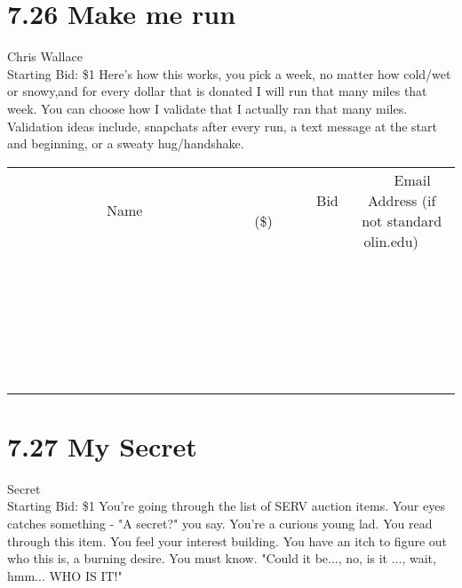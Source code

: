 \documentclass[11pt]{article}
\begin{document}
\section*{7.26 Make me run}
Chris Wallace
\\
Starting Bid: \$1
\newline
Here's how this works, you pick a week, no matter how cold/wet or snowy,and for every dollar that is donated I will run that many miles that week. You can choose how I validate that I actually ran that many miles. Validation ideas include, snapchats after every run, a text message at the start and beginning, or a sweaty hug/handshake.
\\[6ex]
\begin{tabular}{c c c}
~~~~~~~~~~~~~Name~~~~~~~~~~~~~ & ~~~~~~~~~Bid (\$)~~~~~~~~~  & ~~~Email Address (if not standard olin.edu)~~~\\
 & & \\
\hline
 & & \\
\hline
 & & \\
\hline
 & & \\
\hline
 & & \\
\hline
 & & \\
\hline
 & & \\
\hline
 & & \\
\hline
 & & \\
\hline
 & & \\
\hline
 & & \\
\hline
 & & \\
\hline
 & & \\
\hline
 & & \\
\hline
 & & \\
\hline
 & & \\
\hline
 & & \\
\hline
 & & \\
\hline
 & & \\
\hline
 & & \\
\hline
 & & \\
\hline
 & & \\
\hline
 & & \\
\hline
 & & \\
\hline
 & & \\
\hline
 & & \\
\hline
\end{tabular}
\newpage
\section*{7.27 My Secret}
Secret
\\
Starting Bid: \$1
\newline
You're going through the list of SERV auction items. Your eyes catches something - "A secret?" you say. You're a curious young lad. You read through this item. You feel your interest building. You have an itch to figure out who this is, a burning desire. You must know. "Could it be..., no, is it ..., wait, hmm... WHO IS IT!"
\end{document}

